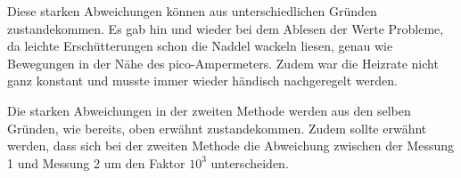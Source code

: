 \noindent
Diese starken Abweichungen können aus unterschiedlichen Gründen zustandekommen. Es gab hin und wieder bei dem Ablesen der Werte Probleme, da leichte Erschütterungen schon die Naddel
wackeln liesen, genau wie Bewegungen in der Nähe des pico-Ampermeters. Zudem war die Heizrate nicht ganz konstant und musste immer wieder händisch nachgeregelt werden.

\noindent
Die starken Abweichungen in der zweiten Methode werden aus den selben Gründen, wie bereits, oben erwähnt zustandekommen. Zudem sollte erwähnt werden, dass sich bei der zweiten Methode
die Abweichung zwischen der Messung 1 und Messung 2 um den Faktor $10^{3}$ unterscheiden.

